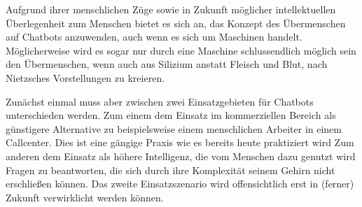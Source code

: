 Aufgrund ihrer menschlichen Züge sowie in Zukunft möglicher intellektuellen Überlegenheit zum Menschen bietet es sich an, das Konzept des Übermenschen auf Chatbots anzuwenden, auch wenn es sich um Maschinen handelt.
Möglicherweise wird es sogar nur durch eine Maschine schlussendlich möglich sein den Übermenschen, wenn auch aus Silizium anstatt Fleisch und Blut, nach Nietzsches Vorstellungen zu kreieren.

Zunächst einmal muss aber zwischen zwei Einsatzgebieten für Chatbots unterschieden werden. 
Zum einem dem Einsatz im kommerziellen Bereich als günstigere Alternative zu beispielsweise einem menschlichen Arbeiter in einem Callcenter. 
Dies ist eine gängige Praxis wie es bereits heute praktiziert wird
Zum anderen dem Einsatz als höhere Intelligenz, die vom Menschen dazu genutzt wird Fragen zu beantworten, die sich durch ihre Komplexität seinem Gehirn nicht erschließen können.
Das zweite Einsatzszenario wird offensichtlich erst in (ferner) Zukunft verwirklicht werden können.



